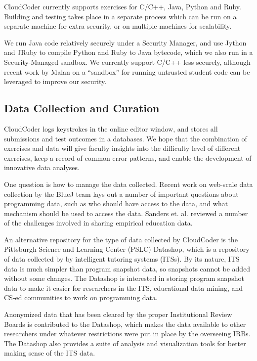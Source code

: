 \documentclass{sig-alternate}
\begin{document}
CloudCoder currently supports exercises for C/C++, Java, Python and
Ruby.  Building and testing takes place in a separate process which
can be run on a separate machine for extra security, or on multiple
machines for scalability.

We run Java code relatively securely under a Security Manager, and 
use Jython and JRuby to compile Python and Ruby to Java
bytecode, which we also run in a Security-Managed sandbox.  We
currently support C/C++ less securely, although 
recent work by Malan \cite{Malan:2013:CSS:2445196.2445242} on a
``sandbox'' for running untrusted student code can be leveraged to improve our security.


\subsection{Data Collection and Curation}

CloudCoder logs keystrokes in the online editor window, and 
stores all submissions and test outcomes in a databases.
We hope that the combination of exercises and data will give faculty
insights into the difficulty level of different exercises, keep a
record of common error patterns, and enable the development of
innovative data analyses.


One question is how to manage the data collected.  
Recent work on web-scale data collection by the BlueJ team
\cite{Utting:2012:WDG:2361276.2361278} lays out a number of important
questions about programming data, such as who should have access to the data, and what
mechanism should be used to access the data.  Sanders
et. al. \cite{Sanders:2008:DSE:1404520.1404534} reviewed a number of
the challenges involved in sharing empirical education data.  

An alternative repository for the type of data collected by CloudCoder
is the Pittsburgh Science and Learning Center (PSLC) Datashop, which
is a repository of data collected by by intelligent tutoring
systems (ITSs).  By its nature, ITS data is much simpler than program
snapshot data, so snapshots cannot be added without some changes.
The Datashop is interested in storing program
snapshot data to make it easier for researchers in the ITS, educational data
mining, and CS-ed communities to work on programming data.

Anonymized data that has been cleared by the proper Institutional
Review Boards is contributed to the Datashop, which
makes the data available to other researchers under whatever
restrictions were put in place by the overseeing IRBs.  The Datashop also
provides a suite of analysis and visualization tools for better making
sense of the ITS data.
\end{document}
